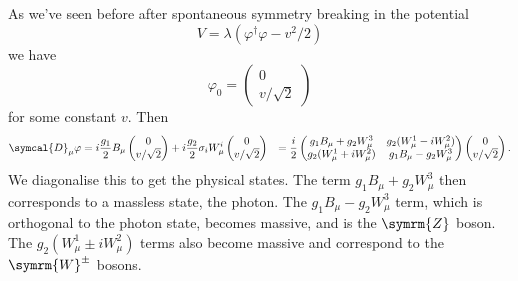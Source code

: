\documentclass[fleqn]{NotesClass}
\newcommand{\Pparticle}[1]{\symrm{#1}}
\newcommand{\PWpm}{\ensuremath{\Pparticle{W}^{\pm}}}
\newcommand{\PZ}{\ensuremath{\Pparticle{Z}}}
\newcommand{\hermit}{\dagger}
\newcommand{\covariantDerivative}{\symcal{D}}
\begin{document}
    As we've seen before after spontaneous symmetry breaking in the potential
    \begin{equation}
        V = \lambda(\varphi^\hermit \varphi - v^2/2)
    \end{equation}
    we have
    \begin{equation}
        \varphi_0 = 
        \begin{pmatrix}
            0\\ v/\sqrt{2}
        \end{pmatrix}
    \end{equation}
    for some constant \(v\).
    Then
    \begin{align}
        \covariantDerivative_\mu \varphi &= i\frac{g_1}{2} B_\mu 
        \begin{pmatrix}
            0\\ v/\sqrt{2}
        \end{pmatrix}
        + i\frac{g_2}{2}\sigma_i W^i_\mu
        \begin{pmatrix}
            0\\ v/\sqrt{2}
        \end{pmatrix}
        &= \frac{i}{2}
        \begin{pmatrix}
            g_1 B_\mu + g_2 W^3_\mu & g_2(W^1_\mu - iW^2_\mu)\\
            g_2(W^1_\mu + iW^2_\mu) & g_1B_\mu - g_2 W^3_\mu
        \end{pmatrix}
        \begin{pmatrix}
            0\\ v/\sqrt{2}
        \end{pmatrix}
        .
    \end{align}
    We diagonalise this to get the physical states.
    The term \(g_1 B_\mu + g_2 W_\mu^3\) then corresponds to a massless state, the photon.
    The \(g_1 B_\mu - g_2 W^3_\mu\) term, which is orthogonal to the photon state, becomes massive, and is the \PZ{} boson.
    The \(g_2 (W^1_\mu \pm i W^2_\mu)\) terms also become massive and correspond to the \PWpm{} bosons.
    
\end{document}
